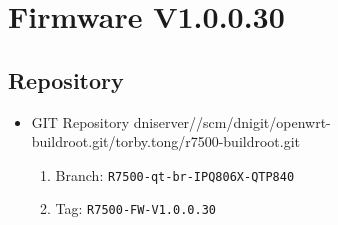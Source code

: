 \documentclass[12pt]{report}
\newcommand{\tlabel}[1]{
  \label{#1}%
  }
\begin{document}
\section{Firmware V1.0.0.30}

\tlabel{sec:1-0-1}
\subsection{Repository}
\begin{itemize}
	\item GIT Repository dniserver//scm/dnigit/openwrt-buildroot.git/torby.tong/r7500-buildroot.git
	\begin{enumerate}
		\item Branch: \texttt{R7500-qt-br-IPQ806X-QTP840}
                \item Tag: \texttt{R7500-FW-V1.0.0.30}
	\end{enumerate}
\end{itemize}
\end{document}
